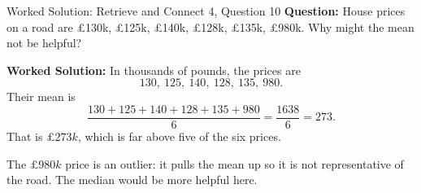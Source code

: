 \documentclass{beamer}
\begin{document}
\begin{frame}{Worked Solution: Retrieve and Connect 4, Question 10}
\textbf{Question:} House prices on a road are \pounds130k, \pounds125k, \pounds140k, \pounds128k, \pounds135k, \pounds980k. Why might the mean not be helpful?

\textbf{Worked Solution:}
In thousands of pounds, the prices are
\[
130,\ 125,\ 140,\ 128,\ 135,\ 980.
\]
Their mean is
\[
\frac{130 + 125 + 140 + 128 + 135 + 980}{6}
= \frac{1638}{6}
= 273.
\]
That is \(\pounds273k\), which is far above five of the six prices.

The \(\pounds980k\) price is an outlier: it pulls the mean up so it is not representative of the road. The median would be more helpful here.
\end{frame}

\end{document}

